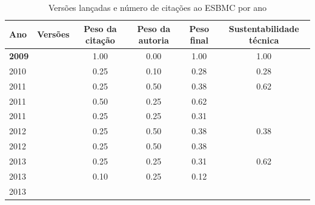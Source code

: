\begin{table}[H]
\caption{Versões lançadas e número de citações ao ESBMC por ano}
\centering
\begin{tabular}{| l | c | c | c | c | c |}
  \hline
  Ano & Versões & Peso da citação & Peso da autoria & Peso final & Sustentabilidade técnica \\
  \hline
            {\bf 2009}
          &
          
          &
          1.00
          &
          0.00
          &
          1.00
          &
            {\color{blue} 1.00}
          \\
\hline
            2010
          &
          
          &
          0.25
          &
          0.10
          &
          0.28
          &
            {\color{red} 0.28}
          \\
\hline
            2011
          &
          
          &
          0.25
          &
          0.50
          &
          0.38
          &
            {\color{blue} 0.62}
          \\
            2011
          &
          
          &
          0.50
          &
          0.25
          &
          0.62
          &
          \\
            2011
          &
          
          &
          0.25
          &
          0.25
          &
          0.31
          &
          \\
\hline
            2012
          &
          
          &
          0.25
          &
          0.50
          &
          0.38
          &
            {\color{red} 0.38}
          \\
            2012
          &
          
          &
          0.25
          &
          0.50
          &
          0.38
          &
          \\
\hline
            2013
          &
          
          &
          0.25
          &
          0.25
          &
          0.31
          &
            {\color{blue} 0.62}
          \\
            2013
          &
          
          &
          0.10
          &
          0.25
          &
          0.12
          &
          \\
            2013
          &
          

\end{tabular}
\end{table}

